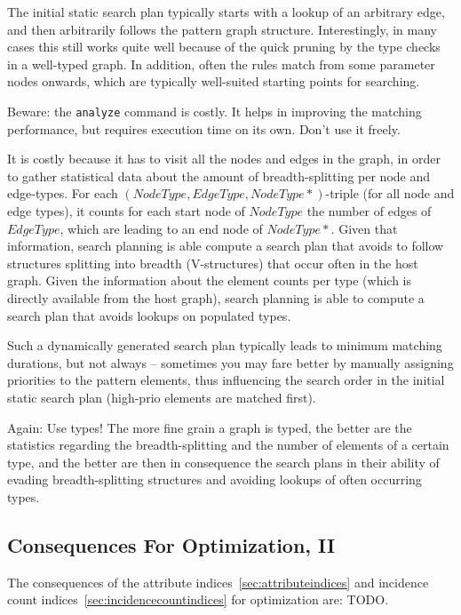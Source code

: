 The initial static search plan typically starts with a lookup of an arbitrary edge, and then arbitrarily follows the pattern graph structure.
Interestingly, in many cases this still works quite well because of the quick pruning by the type checks in a well-typed graph.
In addition, often the rules match from some parameter nodes onwards, which are typically well-suited starting points for searching.

Beware: the \texttt{analyze} command is costly.
It helps in improving the matching performance, but requires execution time on its own.
Don't use it freely.

It is costly because it has to visit all the nodes and edges in the graph,
in order to gather statistical data about the amount of breadth-splitting per node and edge-types. 
For each $(NodeType, EdgeType, NodeType\ast)$-triple (for all node and edge types), it counts for each start node of $NodeType$ the number of edges of $EdgeType$, which are leading to an end node of $NodeType\ast$.
Given that information, search planning is able compute a search plan that avoids to follow structures splitting into breadth (V-structures) that occur often in the host graph.
Given the information about the element counts per type (which is directly available from the host graph), 
search planning is able to compute a search plan that avoids lookups on populated types.

Such a dynamically generated search plan typically leads to minimum matching durations, but not always -- sometimes you may fare better by manually assigning priorities to the pattern elements, thus influencing the search order in the initial static search plan (high-prio elements are matched first).

Again: Use types!
The more fine grain a graph is typed, the better are the statistics regarding the breadth-splitting and the number of elements of a certain type, and the better are then in consequence the search plans in their ability of evading breadth-splitting structures and avoiding lookups of often occurring types.


\subsection{Consequences For Optimization, II}

The consequences of the attribute indices~\ref{sec:attributeindices} and incidence count indices~\ref{sec:incidencecountindices} for optimization are: TODO.

